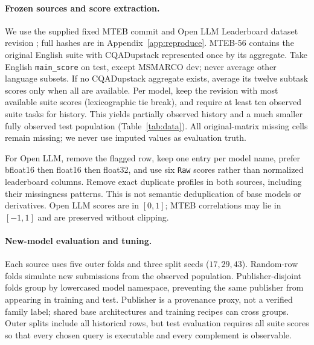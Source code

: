 \documentclass{article}
\begin{document}
\paragraph{Frozen sources and score extraction.}
We use the supplied fixed MTEB commit \citep{mtebdata} and Open LLM Leaderboard dataset revision \citep{olldata}; full hashes are in Appendix~\ref{app:reproduce}. MTEB-56 contains the original English suite with CQADupstack represented once by its aggregate. Take English \texttt{main\_score} on test, except MSMARCO dev; never average other language subsets. If no CQADupstack aggregate exists, average its twelve subtask scores only when all are available. Per model, keep the revision with most available suite scores (lexicographic tie break), and require at least ten observed suite tasks for history. This yields partially observed history and a much smaller fully observed test population (Table~\ref{tab:data}). All original-matrix missing cells remain missing; we never use imputed values as evaluation truth.

For Open LLM, remove the flagged row, keep one entry per model name, prefer bfloat16 then float16 then float32, and use six \texttt{Raw} scores rather than normalized leaderboard columns. Remove exact duplicate profiles in both sources, including their missingness patterns. This is not semantic deduplication of base models or derivatives. Open LLM scores are in $[0,1]$; MTEB correlations may lie in $[-1,1]$ and are preserved without clipping.

\begin{table}[t]
\centering\small
\caption{Frozen analysis cohorts. History counts include partial rows; only complete rows are test eligible. The last column counts publishers among complete rows. Core and modal cohorts are exploratory sensitivities, not independent datasets.}
\label{tab:data}
\end{table}

\paragraph{New-model evaluation and tuning.}
Each source uses five outer folds and three split seeds ($17,29,43$). Random-row folds simulate new submissions from the observed population. Publisher-disjoint folds group by lowercased model namespace, preventing the same publisher from appearing in training and test. Publisher is a provenance proxy, not a verified family label; shared base architectures and training recipes can cross groups. Outer splits include all historical rows, but test evaluation requires all suite scores so that every chosen query is executable and every complement is observable.
\end{document}

